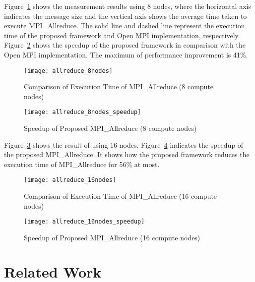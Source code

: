 Figure~\ref{fig:evaluation-8nodes} shows the measurement results using 8
nodes, where the horizontal axis indicates the message size and the
vertical axis shows the average time taken to execute
MPI\_Allreduce. The solid line and dashed line represent the
execution time of the proposed framework and Open MPI implementation,
respectively. Figure~\ref{fig:evaluation-8nodes-normalized} shows the
speedup of the proposed framework in comparison with the Open MPI
implementation. The maximum of performance improvement is 41\%.

\begin{figure}
    \centering
    \texttt{[image: allreduce\_8nodes]}
    \caption{Comparison of Execution Time of MPI\_Allreduce (8 compute nodes)}%
    \label{fig:evaluation-8nodes}
\end{figure}

\begin{figure}
    \centering
    \texttt{[image: allreduce\_8nodes\_speedup]}
    \caption{Speedup of Proposed MPI\_Allreduce (8 compute nodes)}%
    \label{fig:evaluation-8nodes-normalized}
\end{figure}

Figure~\ref{fig:evaluation-16nodes} shows the result of using 16 nodes.
Figure~\ref{fig:evaluation-16nodes-normalized} indicates the speedup of the
proposed MPI\_Allreduce. It shows how the proposed framework reduces the
execution time of MPI\_Allreduce for 56\% at most.

\begin{figure}
    \centering
    \texttt{[image: allreduce\_16nodes]}
    \caption{Comparison of Execution Time of MPI\_Allreduce (16 compute nodes)}%
    \label{fig:evaluation-16nodes}
\end{figure}

\begin{figure}
    \centering
    \texttt{[image: allreduce\_16nodes\_speedup]}
    \caption{Speedup of Proposed MPI\_Allreduce (16 compute nodes)}%
    \label{fig:evaluation-16nodes-normalized}
\end{figure}

\section{Related Work}\label{sec:iii-related-work}

